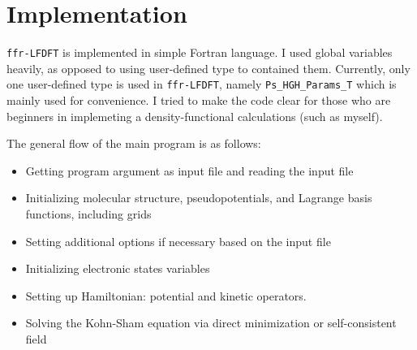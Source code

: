 \section{Implementation}

{\tt ffr-LFDFT} is implemented in simple Fortran language.
I used global variables heavily, as opposed to using user-defined type
to contained them. Currently, only one user-defined type is
used in {\tt ffr-LFDFT}, namely {\tt Ps\_HGH\_Params\_T}
which is mainly used for convenience.
I tried to make the code clear for those who are beginners
in implemeting a density-functional calculations (such as myself).

The general flow of the main program is as follows:
\begin{itemize}
\item Getting program argument as input file and reading the input file
\item Initializing molecular structure, pseudopotentials, and 
Lagrange basis functions, including grids
\item Setting additional options if necessary based on the input file
\item Initializing electronic states variables
\item Setting up Hamiltonian: potential and kinetic operators.
\item Solving the Kohn-Sham equation via direct minimization
or self-consistent field
\end{itemize}








